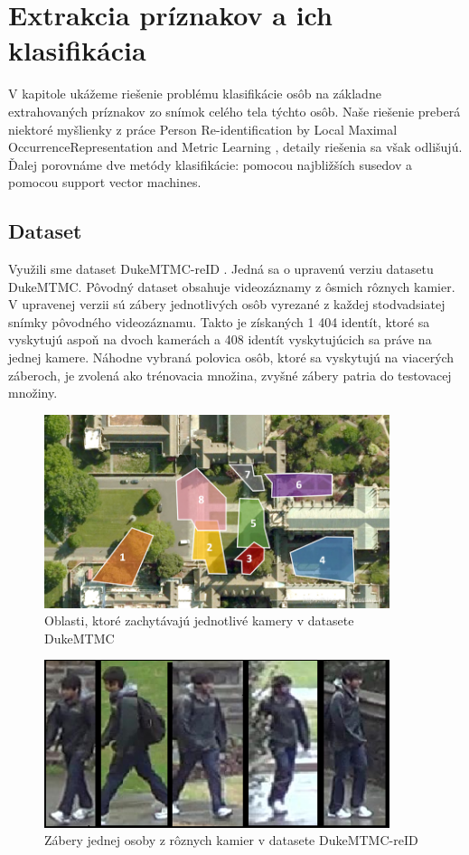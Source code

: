 \chapter{Extrakcia príznakov a ich klasifikácia}
\label{kap:features}
V kapitole ukážeme riešenie problému klasifikácie osôb na základne extrahovaných príznakov zo snímok celého tela týchto osôb.
Naše riešenie preberá niektoré myšlienky z práce Person Re-identification by Local Maximal OccurrenceRepresentation and Metric Learning \cite{featuresinspiration}, detaily riešenia sa však odlišujú.
Ďalej porovnáme dve metódy klasifikácie: pomocou najbližších susedov a pomocou support vector machines.
\section{Dataset}
Využili sme dataset DukeMTMC-reID \cite{ristani2016MTMC} \cite{zheng2017unlabeled}. 
Jedná sa o upravenú verziu datasetu DukeMTMC.
Pôvodný dataset obsahuje videozáznamy z ôsmich rôznych kamier.
V upravenej verzii sú zábery jednotlivých osôb vyrezané z každej stodvadsiatej snímky pôvodného videozáznamu.
Takto je získaných 1 404 identít, ktoré sa vyskytujú aspoň na dvoch kamerách a 408 identít vyskytujúcich sa práve na jednej kamere.
Náhodne vybraná polovica osôb, ktoré sa vyskytujú na viacerých záberoch, je zvolená ako trénovacia množina, zvyšné zábery patria do testovacej množiny.

\begin{figure}[H]
\centerline{\includegraphics[width=0.9\textwidth]{images/duke_topology}}
\caption[Topológia kamier]{Oblasti, ktoré zachytávajú jednotlivé kamery v datasete DukeMTMC}
\label{obr:duke_topology}
\end{figure}

\begin{figure}[H]
\centerline{\includegraphics[width=0.9\textwidth]{images/duke_same}}
\caption[Ukážka datasetu]{Zábery jednej osoby z rôznych kamier v datasete DukeMTMC-reID}
\label{obr:duke_same}
\end{figure}

